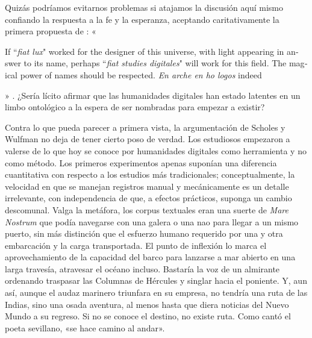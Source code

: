 Quizás podríamos evitarnos problemas si atajamos la discusión aquí mismo confiando la respuesta a la fe y la esperanza, aceptando caritativamente la primera propuesta de \citeauthor{scholes2008}: «\begin{english}If ``\textit{fiat lux}" worked for the designer of this universe, with light appearing in answer to its name, perhaps ``\textit{fiat studies digitales}" will work for this field. The magical power of names should be respected. \textit{En arche en ho logos} indeed\end{english}» \parencite[50]{scholes2008}. ¿Sería lícito afirmar que las humanidades digitales han estado latentes en un limbo ontológico a la espera de ser nombradas para empezar a existir?

Contra lo que pueda parecer a primera vista, la argumentación de Scholes y Wulfman no deja de tener cierto poso de verdad. Los estudiosos empezaron a valerse de lo que hoy se conoce por humanidades digitales como herramienta y no como método. Los primeros experimentos apenas suponían una diferencia cuantitativa con respecto a los estudios más tradicionales; conceptualmente, la velocidad en que se manejan registros manual y mecánicamente es un detalle irrelevante, con independencia de que, a efectos prácticos, suponga un cambio descomunal. Valga la metáfora, los corpus textuales eran una suerte de \textit{Mare Nostrum} que podía navegarse con una galera o una nao para llegar a un mismo puerto, sin más distinción que el esfuerzo humano requerido por una y otra embarcación y la carga transportada. El punto de inflexión lo marca el aprovechamiento de la capacidad del barco para lanzarse a mar abierto en una larga travesía, atravesar el océano incluso. Bastaría la voz de un almirante ordenando traspasar las Columnas de Hércules y singlar hacia el poniente. Y, aun así, aunque el audaz marinero triunfara en su empresa, no tendría una ruta de las Indias, sino una osada aventura, al menos hasta que diera noticias del Nuevo Mundo a su regreso. Si no se conoce el destino, no existe ruta. Como cantó el poeta sevillano, «se hace camino al andar».

